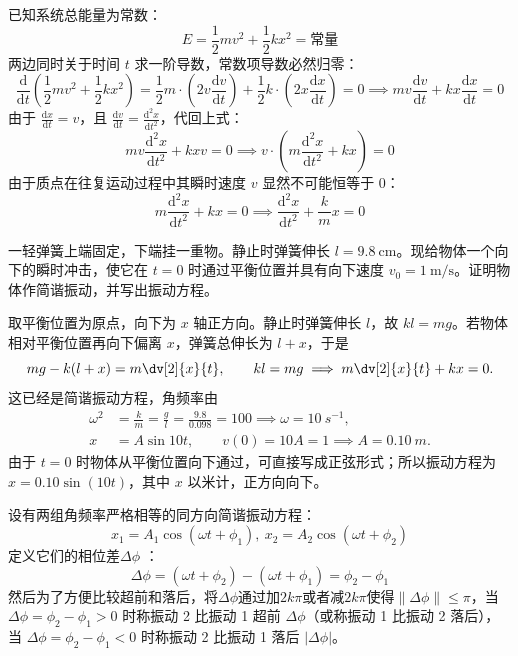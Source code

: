 \begin{note}
已知系统总能量为常数：$$E = \frac{1}{2}m v^2 + \frac{1}{2}k x^2 = \text{常量}$$两边同时关于时间 $t$ 求一阶导数，常数项导数必然归零：$$\frac{\mathrm{d}}{\mathrm{d}t} \left( \frac{1}{2}m v^2 + \frac{1}{2}k x^2 \right) =\frac{1}{2}m \cdot \left( 2v \frac{\mathrm{d}v}{\mathrm{d}t} \right) + \frac{1}{2}k \cdot \left( 2x \frac{\mathrm{d}x}{\mathrm{d}t} \right) = 0 \implies m v \frac{\mathrm{d}v}{\mathrm{d}t} + k x \frac{\mathrm{d}x}{\mathrm{d}t} = 0$$
由于 $\frac{\mathrm{d}x}{\mathrm{d}t} = v$，且 $\frac{\mathrm{d}v}{\mathrm{d}t} = \frac{\mathrm{d}^2x}{\mathrm{d}t^2}$，代回上式：$$m v \frac{\mathrm{d}^2x}{\mathrm{d}t^2} + k x v = 0 \implies v \cdot \left( m \frac{\mathrm{d}^2x}{\mathrm{d}t^2} + k x \right) = 0$$由于质点在往复运动过程中其瞬时速度 $v$ 显然不可能恒等于 0：$$m \frac{\mathrm{d}^2x}{\mathrm{d}t^2} + k x = 0 \implies \boxed{\frac{\mathrm{d}^2x}{\mathrm{d}t^2} + \frac{k}{m}x = 0}$$
\end{note}

\begin{exercise}[用平衡位置证明竖直弹簧振子作简谐振动]
一轻弹簧上端固定，下端挂一重物。静止时弹簧伸长 \(l=9.8\ \text{cm}\)。现给物体一个向下的瞬时冲击，使它在 \(t=0\) 时通过平衡位置并具有向下速度 \(v_0=1\ \text{m/s}\)。证明物体作简谐振动，并写出振动方程。
\end{exercise}

\begin{solution}
取平衡位置为原点，向下为 \(x\) 轴正方向。静止时弹簧伸长 \(l\)，故 \(kl=mg\)。若物体相对平衡位置再向下偏离 \(x\)，弹簧总伸长为 \(l+x\)，于是
\[
mg-k(l+x)=m\dv[2]{x}{t},\qquad kl=mg
\implies m\dv[2]{x}{t}+kx=0.
\]
这已经是简谐振动方程，角频率由
\[
\begin{aligned}
\omega^2&=\frac{k}{m}=\frac{g}{l}
=\frac{9.8}{0.098}=100
\implies \omega=10\ \si{s^{-1}},\\
x&=A\sin 10t,\qquad v(0)=10A=1
\implies A=0.10\ \si{m}.
\end{aligned}
\]由于 \(t=0\) 时物体从平衡位置向下通过，可直接写成正弦形式；所以振动方程为 \(x=0.10\sin(10t)\)，其中 \(x\) 以米计，正方向向下。
\end{solution}

\begin{theorem}[简谐振动的相位关系]
设有两组角频率严格相等的同方向简谐振动方程：$$x_1 = A_1 \cos(\omega t + \phi_1),~x_2 = A_2 \cos(\omega t + \phi_2)$$
定义它们的相位差$\Delta \phi$ ：$$\Delta \phi = (\omega t + \phi_2) - (\omega t + \phi_1) = \phi_2 - \phi_1$$然后为了方便比较超前和落后，将$\Delta \phi$通过加$2k\pi$或者减$2k\pi$使得$\| \Delta \phi \| \le \pi$，当 $\Delta \phi = \phi_2 - \phi_1 > 0$ 时称振动 2 比振动 1 超前 $\Delta \phi$（或称振动 1 比振动 2 落后），当 $\Delta \phi = \phi_2 - \phi_1 < 0$ 时称振动 2 比振动 1 落后 $|\Delta \phi|$。
\end{theorem}


